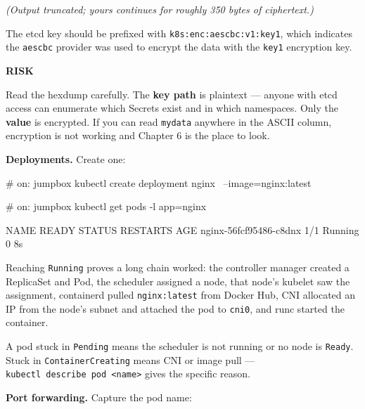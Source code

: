 \documentclass[11pt,oneside]{report}
\newcommand{\calloutlabel}[2]{{\sffamily\bfseries\footnotesize\color{#1}#2\quad}}
\begin{document}
\emph{(Output
truncated; yours
continues for
roughly 350 bytes of
ciphertext.)}

The etcd key should
be prefixed with
\texttt{k8s:}\allowbreak{}\texttt{enc:}\allowbreak{}\texttt{aescbc:}\allowbreak{}\texttt{v1:}\allowbreak{}\texttt{key1},
which indicates the
\texttt{aescbc}
provider was used to
encrypt the data
with the
\texttt{key1}
encryption key.

\begin{riskbox}\calloutlabel{brick}{RISK}

Read the hexdump
carefully. The
\textbf{key path} is
plaintext --- anyone
with etcd access can
enumerate which
Secrets exist and in
which namespaces.
Only the
\textbf{value} is
encrypted. If you
can read
\texttt{mydata}
anywhere in the
ASCII column,
encryption is not
working and Chapter
6 is the place to
look.

\end{riskbox}

\textbf{Deployments.}
Create one:

\begin{cmdlst}
# on: jumpbox
kubectl create deployment nginx \
  --image=nginx:latest
\end{cmdlst}

\begin{cmdlst}
# on: jumpbox
kubectl get pods -l app=nginx
\end{cmdlst}

\begin{cmdlst}
NAME                     READY   STATUS    RESTARTS   AGE
nginx-56fcf95486-c8dnx   1/1     Running   0          8s
\end{cmdlst}

Reaching
\texttt{Running}
proves a long chain
worked: the
controller manager
created a ReplicaSet
and Pod, the
scheduler assigned a
node, that node's
kubelet saw the
assignment,
containerd pulled
\texttt{nginx:latest}
from Docker Hub, CNI
allocated an IP from
the node's subnet
and attached the pod
to \texttt{cni0},
and runc started the
container.

A pod stuck in
\texttt{Pending}
means the scheduler
is not running or no
node is
\texttt{Ready}.
Stuck in
\texttt{ContainerCreating}
means CNI or image
pull ---
\texttt{kubectl\ describe\ pod\ \textless{}name\textgreater{}}
gives the specific
reason.

\textbf{Port
forwarding.} Capture
the pod name:

\end{document}

